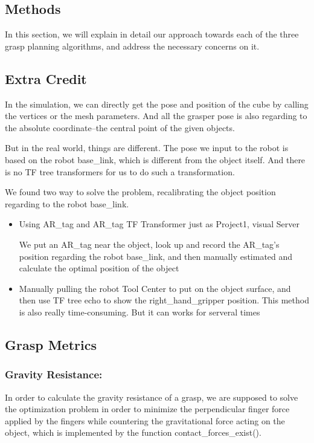 \documentclass{article}
\begin{document}
\begin{multicols}{2} 
\section{Methods}
In this section, we will explain in detail our approach towards each of the three grasp planning algorithms, and address the necessary concerns on it. 
\subsection{Extra Credit}
In the simulation, we can directly get the pose and position of the cube by calling the vertices or the mesh parameters. And all the grasper pose is also regarding to the absolute coordinate--the central point of the given objects. 

But in the real world, things are different. The pose we input to the robot is based on the robot base\_link, which is different from the object itself. And there is no TF tree transformers for us to do such a transformation.

We found two way to solve the problem, recalibrating the object position regarding to the robot base\_link. 
\begin{itemize}
    \item Using AR\_tag and AR\_tag TF Transformer just as Project1, visual Server

We put an AR\_tag near the object, look up and record the AR\_tag's position regarding the robot base\_link, and then manually estimated and calculate the optimal position of the object

    \item  Manually pulling the robot Tool Center to put on the object surface, and then use TF tree echo to show the right\_hand\_gripper position. This method is also really time-consuming. But it can works for serveral times
    
\end{itemize}




\subsection{Grasp Metrics}


\subsubsection{Gravity Resistance:} 

In order to calculate the gravity resistance of a grasp, we are supposed to solve the optimization problem in order to minimize the perpendicular finger force applied by the fingers while countering the gravitational force acting on the object, which is implemented by the function contact\_forces\_exist().



\end{multicols}
\end{document}
